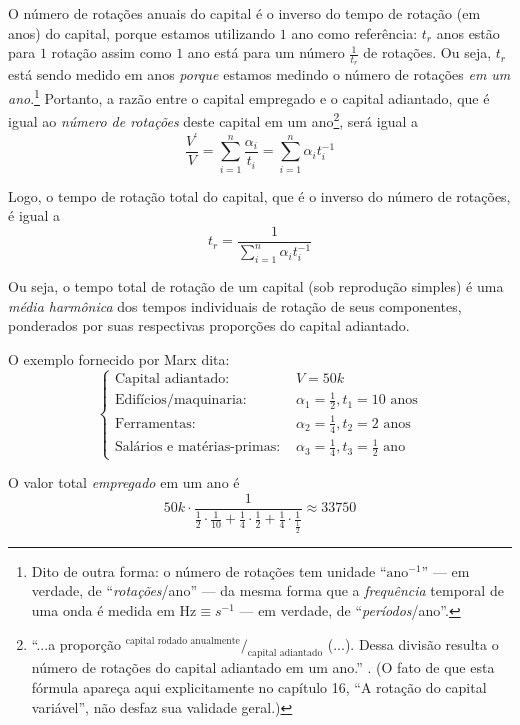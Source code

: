 O número de rotações anuais do capital é o inverso do tempo de rotação (em anos) do capital, porque estamos utilizando $1$ ano como referência: $t_{r}$ anos estão para $1$ rotação assim como $1$ ano está para um número $\frac{1}{t_{r}}$ de rotações. Ou seja, $t_{r}$ está sendo medido em anos \textit{porque} estamos medindo o número de rotações \textit{em um ano}.\footnote{Dito de outra forma: o número de rotações tem unidade ``$\text{ano}^{-1}$'' — em verdade, de ``\textit{rotações}/ano'' — da mesma forma que a \textit{frequência} temporal de uma onda é medida em $\text{Hz}\equiv s^{-1}$ — em verdade, de ``\textit{períodos}/ano''.} Portanto, a razão entre o capital empregado e o capital adiantado, que é igual ao \textit{número de rotações} deste capital em um ano\footnote{``...a proporção $^\text{capital rodado anualmente}/_{\text{capital adiantado}}$ (...). Dessa divisão resulta o número de rotações do capital adiantado em um ano.'' \parencite[p. 399]{Marx2014}. (O fato de que esta fórmula apareça aqui explicitamente no capítulo 16, ``A rotação do capital variável'', não desfaz sua validade geral.)}, será igual a
$$
\frac{V^\prime}{V} = \sum \limits_{i=1}^{n} \frac{\alpha_{i}}{t_{i}} = \sum \limits_{i=1}^{n} \alpha_{i} t_{i}^{-1}
$$

Logo, o tempo de rotação total do capital, que é o inverso do número de rotações, é igual a
$$
t_{r} = \frac{1}{\sum \limits_{i=1}^{n} \alpha_{i} t_{i}^{-1}}
$$

Ou seja, o tempo total de rotação de um capital (sob reprodução simples) é uma \textit{média harmônica} dos tempos individuais de rotação de seus componentes, ponderados por suas respectivas proporções do capital adiantado.

O exemplo fornecido por Marx \parencite[p. 270-1]{Marx2014} dita:
$$
\begin{cases}
\text{Capital adiantado}: &V = 50k\\
\text{Edifícios/maquinaria: }&\alpha_{1}=\frac{1}{2}, t_{1}=10 \text{ anos} \\
\text{Ferramentas: }&\alpha_{2}=\frac{1}{4}, t_{2}=2 \text{ anos}\\
\text{Salários e matérias-primas: }&\alpha_{3}=\frac{1}{4}, t_{3}=\frac{1}{2} \text{ ano}
\end{cases}
$$

O valor total \textit{empregado} em um ano é
$$
50k \cdot \frac{1}{\frac{1}{2}\cdot \frac{1}{10} + \frac{1}{4} \cdot \frac{1}{2} + \frac{1}{4} \cdot \frac{1}{\frac{1}{2}}} \approx 33750
$$

